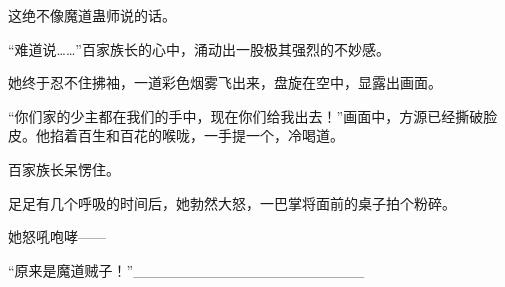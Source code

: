 \begin{this_body}
这绝不像魔道蛊师说的话。

“难道说……”百家族长的心中，涌动出一股极其强烈的不妙感。

她终于忍不住拂袖，一道彩色烟雾飞出来，盘旋在空中，显露出画面。

“你们家的少主都在我们的手中，现在你们给我出去！”画面中，方源已经撕破脸皮。他掐着百生和百花的喉咙，一手提一个，冷喝道。

百家族长呆愣住。

足足有几个呼吸的时间后，她勃然大怒，一巴掌将面前的桌子拍个粉碎。

她怒吼咆哮——

“原来是魔道贼子！”\_\_\_\_\_\_\_\_\_\_\_\_\_\_\_\_\_\_\_\_\_\_

\end{this_body}


